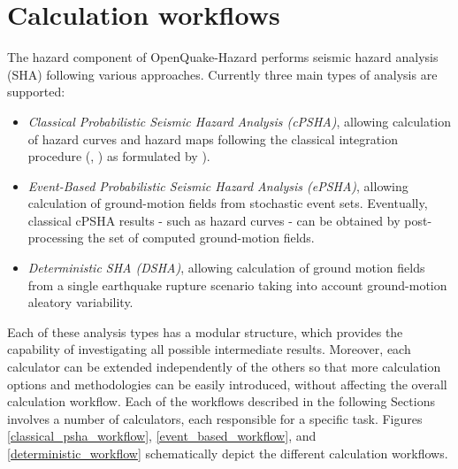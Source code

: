 \section{Calculation workflows}
The hazard component of OpenQuake-Hazard performs seismic hazard 
analysis (SHA) following various approaches. 
%
Currently three main types of analysis are supported:
\begin{itemize}
\item \textit{Classical Probabilistic Seismic Hazard Analysis (cPSHA)}, 
allowing calculation of hazard curves and hazard maps following the 
classical integration procedure 
(\cite{cornell1968}, \citet{mcguire1976}) as formulated by \cite{field2003}).
\item \textit{Event-Based Probabilistic Seismic Hazard Analysis (ePSHA)}, 
allowing calculation of ground-motion fields from stochastic event sets. 
Eventually, classical cPSHA results - such as hazard curves - can be 
obtained by post-processing the set of computed ground-motion fields.
\item \textit{Deterministic SHA (DSHA)}, allowing calculation of ground 
motion fields from a single earthquake rupture scenario taking into account 
ground-motion aleatory variability.
\end{itemize}
Each of these analysis types has a modular structure, which provides the capability of investigating 
all possible intermediate results. Moreover, each calculator can be 
extended independently of the others so that more calculation 
options and methodologies can be easily introduced, without affecting the 
overall calculation workflow. 
Each of the workflows described in the following Sections involves a number 
of calculators, each responsible for a specific task. 
Figures \ref{classical_psha_workflow}, \ref{event_based_workflow}, and 
\ref{deterministic_workflow} schematically depict the different calculation 
workflows.
%
